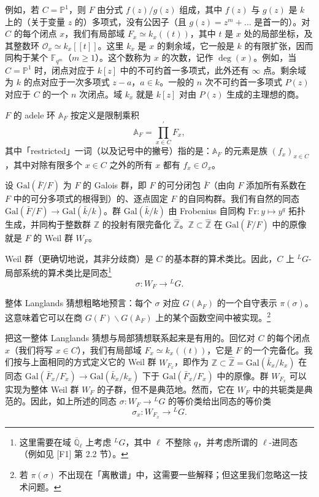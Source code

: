 例如，若 $C=\mathbb{P}^1$，则 $F$ 由分式 $f(z)/g(z)$ 组成，其中 $f(z)$ 与 $g(z)$ 是 $k$ 上的（关于变量 $z$ 的）多项式，没有公因子（且 $g(z)=z^m+\ldots$ 是首一的）。对 $C$ 的每个闭点 $x$，我们有局部域 $F_x\simeq k_x((t))$，其中 $t$ 是 $x$ 处的局部坐标，及其整数环 $\mathcal{O}_x\simeq k_x[[t]]$。这里 $k_x$ 是 $x$ 的剩余域，它一般是 $k$ 的有限扩张，因而同构于某个 $\mathbb{F}_{q^m}$（$m\geq 1$）。这个数称为 $x$ 的次数，记作 $\deg(x)$。例如，当 $C=\mathbb{P}^1$ 时，闭点对应于 $k[z]$ 中的不可约首一多项式，此外还有 $\infty$ 点。剩余域为 $k$ 的点对应于一次多项式 $z-a$，$a\in k$。一般的 $n$ 次不可约首一多项式 $P(z)$ 对应于 $C$ 的一个 $n$ 次闭点。域 $k_x$ 就是 $k[z]$ 对由 $P(z)$ 生成的主理想的商。

$F$ 的 adele 环 $\mathbb{A}_F$ 按定义是限制乘积
\[
\mathbb{A}_F = \prod_{x\in C}^{\prime} F_x,
\]
其中「restricted」一词（以及记号中的撇号）指的是：$\mathbb{A}_F$ 的元素是族 $(f_x)_{x\in C}$，其中对除有限多个 $x\in C$ 之外的所有 $x$ 都有 $f_x\in\mathcal{O}_x$。

设 $\mathrm{Gal}(\bar F/F)$ 为 $F$ 的 Galois 群，即 $F$ 的可分闭包 $\bar F$（由向 $F$ 添加所有系数在 $F$ 中的可分多项式的根得到）的、逐点固定 $F$ 的自同构群。我们有自然的同态 $\mathrm{Gal}(\bar F/F)\to\mathrm{Gal}(\bar k/k)$。群 $\mathrm{Gal}(\bar k/k)$ 由 Frobenius 自同构 $\mathrm{Fr}: y\mapsto y^q$ 拓扑生成，并同构于整数群 $\mathbb{Z}$ 的投射有限完备化 $\widehat{\mathbb{Z}}$。$\mathbb{Z}\subset\widehat{\mathbb{Z}}$ 在 $\mathrm{Gal}(\bar F/F)$ 中的原像就是 $F$ 的 Weil 群 $W_F$。


Weil 群（更确切地说，其非分歧商）是 $C$ 的基本群的算术类比。因此，$C$ 上 ${}^{L}G$-局部系统的算术类比是同态\footnote{这里需要在域 $\overline{\mathbb{Q}}_\ell$ 上考虑 ${}^{L}G$，其中 $\ell$ 不整除 $q$，并考虑所谓的 $\ell$-进同态（例如见 [F1] 第 2.2 节）。}
\[
\sigma: W_F\to {}^{L}G.
\]

整体 Langlands 猜想粗略地预言：每个 $\sigma$ 对应 $G(\mathbb{A}_F)$ 的一个自守表示 $\pi(\sigma)$。这意味着它可以在商 $G(F)\backslash G(\mathbb{A}_F)$ 上的某个函数空间中被实现。\footnote{若 $\pi(\sigma)$ 不出现在「离散谱」中，这需要一些解释；但这里我们忽略这一技术问题。}

把这一整体 Langlands 猜想与局部猜想联系起来是有用的。回忆对 $C$ 的每个闭点 $x$（我们将写 $x\in C$），我们有局部域 $F_x\simeq k_x((t))$，它是 $F$ 的一个完备化。我们按与上面相同的方式定义它的 Weil 群 $W_{F_x}$，即作为 $\mathbb{Z}\subset\widehat{\mathbb{Z}}=\mathrm{Gal}(\bar k_x/k_x)$ 在同态 $\mathrm{Gal}(\bar F_x/F_x)\to\mathrm{Gal}(\bar k_x/k_x)$ 下于 $\mathrm{Gal}(\bar F_x/F_x)$ 中的原像。群 $W_{F_x}$ 可以实现为整体 Weil 群 $W_F$ 的子群，但不是典范地。然而，它在 $W_F$ 中的共轭类是典范的。因此，如上所述的同态 $\sigma: W_F\to {}^{L}G$ 的等价类给出同态的等价类
\[
\sigma_x: W_{F_x}\to {}^{L}G.
\]


